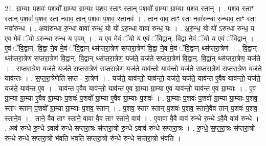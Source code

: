 \documentclass[17pt]{extarticle}
\begin{document}
21. ग्रा॒म्याः प॒शवः॑ प॒शवो᳚ ग्रा॒म्या ग्रा॒म्याः प॒शव॒ स्ताꣳ स्तान् प॒शवो᳚ ग्रा॒म्या ग्रा॒म्याः प॒शव॒ स्तान् । . प॒शव॒ स्ताꣳ स्तान् प॒शवः॑ प॒शव॒ स्ता नवाव॒ तान् प॒शवः॑ प॒शव॒ स्तानव॑ । . तान वाव॒ ताꣳ स्ता नवा॑रुन्धा रु॒न्धाव॒ ताꣳ स्ता नवा॑रुन्ध । . अवा॑रुन्धा रु॒न्धा वावा॑ रुन्ध॒ यो यो॑ ऽरु॒न्धा वावा॑ रुन्ध॒ यः । . अ॒रु॒न्ध॒ यो यो॑ ऽरुन्धा रुन्ध॒ य ए॒व मे॒वं ॅयो॑ ऽरुन्धा रुन्ध॒ य ए॒वम् । . य ए॒व मे॒वं ॅयो य ए॒वं ॅवि॒द्वान्. वि॒द्वा ने॒वं ॅयो य ए॒वं ॅवि॒द्वान् । . ए॒वं ॅवि॒द्वान्. वि॒द्वा ने॒व मे॒वं ॅवि॒द्वान् थ्स॑प्तरा॒त्रेण॑ सप्तरा॒त्रेण॑ वि॒द्वा ने॒व मे॒वं ॅवि॒द्वान् थ्स॑प्तरा॒त्रेण॑ । . वि॒द्वान् थ्स॑प्तरा॒त्रेण॑ सप्तरा॒त्रेण॑ वि॒द्वान्. वि॒द्वान् थ्स॑प्तरा॒त्रेण॒ यज॑ते॒ यज॑ते सप्तरा॒त्रेण॑ वि॒द्वान्. वि॒द्वान् थ्स॑प्तरा॒त्रेण॒ यज॑ते । . स॒प्त॒रा॒त्रेण॒ यज॑ते॒ यज॑ते सप्तरा॒त्रेण॑ सप्तरा॒त्रेण॒ यज॑ते॒ याव॑न्तो॒ याव॑न्तो॒ यज॑ते सप्तरा॒त्रेण॑ सप्तरा॒त्रेण॒ यज॑ते॒ याव॑न्तः । . स॒प्त॒रा॒त्रेणेति॑ सप्त - रा॒त्रेण॑ । . यज॑ते॒ याव॑न्तो॒ याव॑न्तो॒ यज॑ते॒ यज॑ते॒ याव॑न्त ए॒वैव याव॑न्तो॒ यज॑ते॒ यज॑ते॒ याव॑न्त ए॒व । . याव॑न्त ए॒वैव याव॑न्तो॒ याव॑न्त ए॒व ग्रा॒म्या ग्रा॒म्या ए॒व याव॑न्तो॒ याव॑न्त ए॒व ग्रा॒म्याः । . ए॒व ग्रा॒म्या ग्रा॒म्या ए॒वैव ग्रा॒म्याः प॒शवः॑ प॒शवो᳚ ग्रा॒म्या ए॒वैव ग्रा॒म्याः प॒शवः॑ । . ग्रा॒म्याः प॒शवः॑ प॒शवो᳚ ग्रा॒म्या ग्रा॒म्याः प॒शव॒ स्ताꣳ स्तान् प॒शवो᳚ ग्रा॒म्या ग्रा॒म्याः प॒शव॒ स्तान् । . प॒शव॒ स्ताꣳ स्तान् प॒शवः॑ प॒शव॒ स्ताने॒वैव तान् प॒शवः॑ प॒शव॒ स्ताने॒व । . ताने॒ वैव ताꣳ स्ताने॒ वावा वै॒व ताꣳ स्ताने॒ वाव॑ । . ए॒वावा वै॒वै वाव॑ रुन्धे रु॒न्धे ऽवै॒वै वाव॑ रुन्धे । . अव॑ रुन्धे रु॒न्धे ऽवाव॑ रुन्धे सप्तरा॒त्रः स॑प्तरा॒त्रो रु॒न्धे ऽवाव॑ रुन्धे सप्तरा॒त्रः । . रु॒न्धे॒ स॒प्त॒रा॒त्रः स॑प्तरा॒त्रो रु॑न्धे रुन्धे सप्तरा॒त्रो भ॑वति भवति सप्तरा॒त्रो रु॑न्धे रुन्धे सप्तरा॒त्रो भ॑वति । \newline
\end{document}
